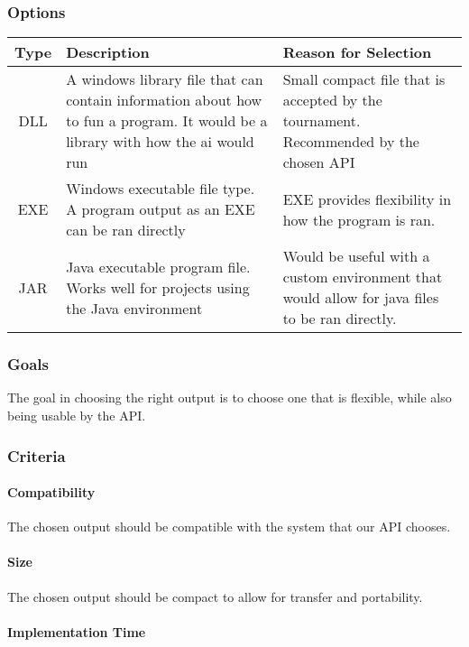 \documentclass[10pt,letterpaper,onecolumn,draftclsnofoot]{IEEEtran}
\begin{document}
\subsubsection{Options}
\begin{center}
	\begin{tabular}{ ||C|L|L|| } 
		\hline
		Type & Description & Reason for Selection \\
		\hline
		DLL & A windows library file that can contain information about how to fun a program. It would be a library with how the ai would run & Small compact file that is accepted by the tournament. Recommended by the chosen API \\ 
		\hline
		EXE & Windows executable file type. A program output as an EXE can be ran directly & EXE provides flexibility in how the program is ran. \\ 
		\hline
		JAR & Java executable program file. Works well for projects using the Java environment & Would be useful with a custom environment that would allow for java files to be ran directly. \\ 
		\hline
	\end{tabular}
\end{center}
\subsubsection{Goals}
The goal in choosing the right output is to choose one that is flexible, while also being usable by the API.
\subsubsection{Criteria}
\paragraph{Compatibility}
The chosen output should be compatible with the system that our API chooses.
\paragraph{Size}
The chosen output should be compact to allow for transfer and portability.
\paragraph{Implementation Time}
\end{document}
